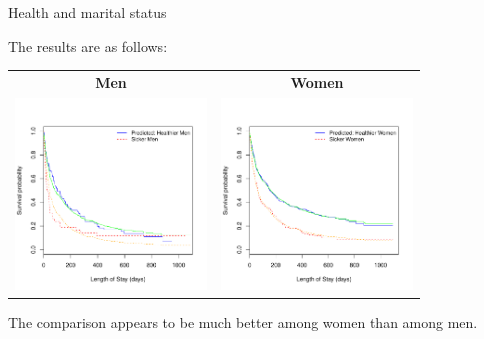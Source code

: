 \documentclass[envcountsect, 10pt, portrait, palatino]{beamer}
\begin{document}
\begin{frame}{Health and marital status}

The results are as follows:
\begin{center}
\begin{tabular}{cc}
{\bf Men} & {\bf Women}\\
\includegraphics[width=2in]{ch12kmph_males.pdf} &
\includegraphics[width=2in]{ch12kmph_females.pdf}
\end{tabular}
\end{center}
The comparison appears to be much better among women than among men.
\end{frame}
\end{document}
